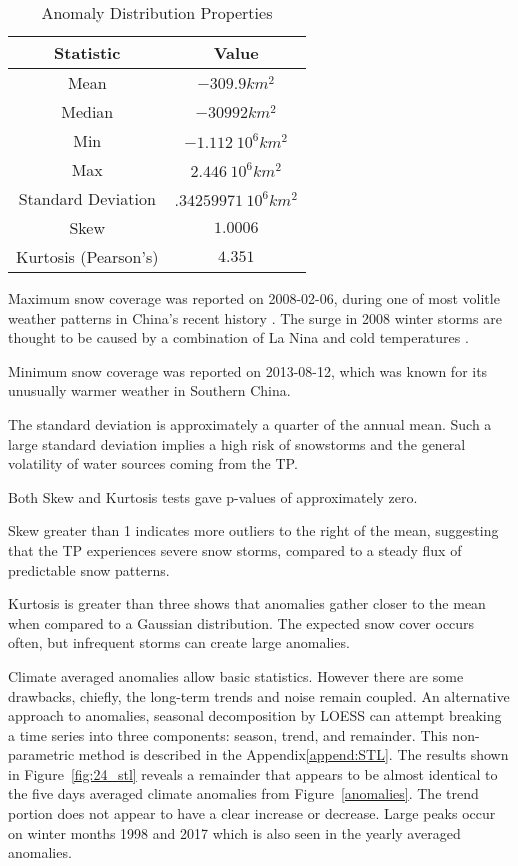 \begin{table}[hbt]
\centering
\caption{Anomaly Distribution Properties \label{anom_table}}
{\begin{tabular}{|c|c|}
\hline
\textbf{Statistic} & \textbf{Value}
\\ \hline
Mean\hphantom{00} & \hphantom{0}$-309.9 km^{2}$
\\ \hline
Median\hphantom{00} & \hphantom{0}$-30992 km^{2}$
\\ \hline
Min\hphantom{00} & \hphantom{0}$-1.112\ 10^6 km^{2}$
\\ \hline
Max\hphantom{00} & \hphantom{0}$2.446\ 10^6 km^{2}$
\\ \hline
Standard Deviation\hphantom{00} & \hphantom{0}$.34259971\ 10^6 km^{2}$
\\ \hline
Skew\hphantom{00} & $1.0006$
\\ \hline
Kurtosis (Pearson's) \hphantom{00} & $4.351$
\\ \hline
\end{tabular} }
\end{table}

Maximum snow coverage was reported on 2008-02-06, during one of most volitle weather patterns in China's recent history \cite{bbc}. The surge in 2008 winter storms are thought to be caused by a combination of La Nina and cold temperatures \cite{reutersUK}.

Minimum snow coverage was reported on 2013-08-12, which was known for its unusually warmer weather in Southern China\cite{NOAANCDC}.

The standard deviation is approximately a quarter of the annual mean. Such a large standard deviation implies a high risk of snowstorms and the general volatility of water sources coming from the TP.   

Both Skew and Kurtosis tests gave p-values of approximately zero.

Skew greater than 1 indicates more outliers to the right of the mean, suggesting that the TP experiences severe snow storms, compared to a steady flux of predictable snow patterns. 

Kurtosis is greater than three shows that anomalies gather closer to the mean when compared to a Gaussian distribution. The expected snow cover occurs often, but infrequent storms can create large anomalies.

Climate averaged anomalies allow basic statistics. However there are some drawbacks, chiefly, the long-term trends and noise remain coupled. An alternative approach to anomalies, seasonal decomposition by LOESS can attempt breaking a time series into three components: season, trend, and remainder. This non-parametric method is described in the Appendix\ref{append:STL}. The results shown in Figure~\ref{fig:24_stl} reveals a remainder that appears to be almost identical to the five days averaged climate anomalies from Figure~\ref{anomalies}. The trend portion does not appear to have a clear increase or decrease. Large peaks occur on winter months 1998 and 2017 which is also seen in the yearly averaged anomalies.

